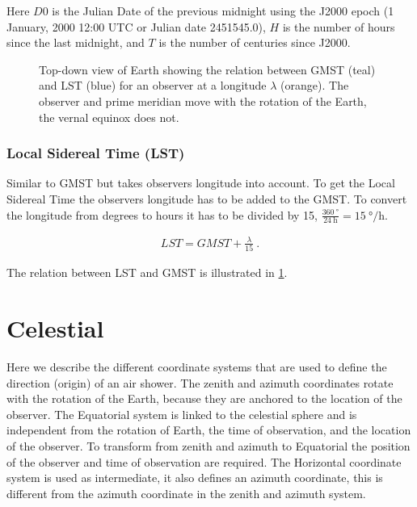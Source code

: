 Here $D0$ is the Julian Date of the previous midnight using the J2000
epoch (1 January, 2000 12:00 UTC or Julian date 2451545.0), $H$ is the
number of hours since the last midnight, and $T$ is the number of
centuries since J2000.

\begin{figure}
    \centering
    
    \caption{Top-down view of Earth showing the relation between GMST
             (teal) and LST (blue) for an observer at a longitude
             $\lambda$ (orange). The observer and prime meridian move with
             the rotation of the Earth, the vernal equinox does not.}
    \label{fig:wgs84_gmst_lst}
\end{figure}


\subsubsection{Local Sidereal Time (LST)}

Similar to GMST but takes observers longitude into account. To get the
Local Sidereal Time the observers longitude has to be added to the GMST.
To convert the longitude from degrees to hours it has to be divided by
15, $\frac{\SI{360}{\degree}}{\SI{24}{\hour}} =
\SI{15}{\degree\per\hour}$.

\begin{equation}
    \begin{array}{l}
        \mathit{LST} = \mathit{GMST} + \frac{\lambda}{15} \ .
    \end{array}
\end{equation}

The relation between LST and GMST is illustrated in
\cref{fig:wgs84_gmst_lst}.


\section{Celestial}
\label{sec:celestial}

Here we describe the different coordinate systems that are used to
define the direction (origin) of an air shower. The zenith and azimuth
coordinates rotate with the rotation of the Earth, because they are
anchored to the location of the observer. The Equatorial system is
linked to the celestial sphere and is independent from the rotation of
Earth, the time of observation, and the location of the observer. To
transform from zenith and azimuth to Equatorial the position of the
observer and time of observation are required. The Horizontal coordinate
system is used as intermediate, it also defines an azimuth coordinate,
this is different from the azimuth coordinate in the zenith and azimuth
system.


